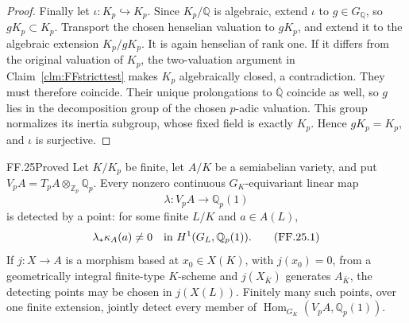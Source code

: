 \begin{proof}
Finally let \(\iota:K_p\hookrightarrow K_p\).
Since \(K_p/\mathbb Q\) is algebraic, extend
\(\iota\) to \(g\in G_{\mathbb Q}\), so
\(gK_p\subset K_p\). Transport the chosen
henselian valuation to \(gK_p\), and extend it
to the algebraic extension \(K_p/gK_p\).
It is again henselian of rank one. If it differs
from the original valuation of \(K_p\), the
two-valuation argument in
Claim~\ref{clm:FFstricttest} makes \(K_p\)
algebraically closed, a contradiction. They must
therefore coincide. Their unique prolongations
to \(\overline{\mathbb Q}\) coincide as well,
so \(g\) lies in the decomposition group of
the chosen \(p\)-adic valuation. This group
normalizes its inertia subgroup, whose fixed
field is exactly \(K_p\). Hence \(gK_p=K_p\),
and \(\iota\) is surjective.
\end{proof}

\begin{claim}{FF.25}{Proved}\label{clm:FFpdetector}
Let \(K/K_p\) be finite, let \(A/K\) be a semiabelian
variety, and put \(V_pA=T_pA\otimes_{\mathbb Z_p}\mathbb Q_p\).
Every nonzero continuous \(G_K\)-equivariant linear map
\[
                  \lambda:V_pA\longrightarrow\mathbb Q_p(1)
\]
is detected by a point: for some finite \(L/K\) and
\(a\in A(L)\),
\[
             \lambda_*\kappa_A(a)\ne0
                 \quad\hbox{in }H^1(G_L,\mathbb Q_p(1)). \tag{FF.25.1}
\]
If \(j:X\to A\) is a morphism based at \(x_0\in X(K)\),
with \(j(x_0)=0\), from a geometrically
integral finite-type \(K\)-scheme and \(j(X_{\bar K})\)
generates \(A_{\bar K}\), the detecting points may be
chosen in \(j(X(L))\). Finitely many such points,
over one finite extension, jointly detect every member of
\(\operatorname{Hom}_{G_K}(V_pA,\mathbb Q_p(1))\).
\end{claim}


